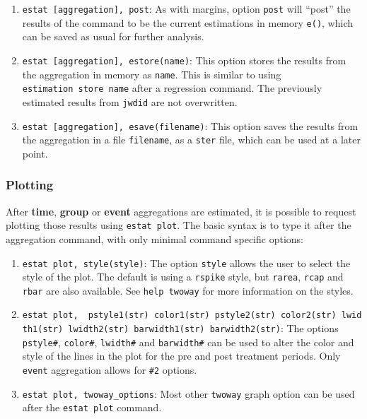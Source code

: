 \documentclass[
  letterpaper,
  DIV=11,
  numbers=noendperiod]{scrartcl}
\providecommand{\tightlist}{%
  \setlength{\itemsep}{0pt}\setlength{\parskip}{0pt}}\usepackage{longtable,booktabs,array}
\begin{document}
\begin{enumerate}
\def\labelenumi{\arabic{enumi}.}
\tightlist
\item
  \texttt{estat\ {[}aggregation{]},\ post}: As with margins, option
  \texttt{post} will ``post'' the results of the command to be the
  current estimations in memory \texttt{e()}, which can be saved as
  usual for further analysis.
\item
  \texttt{estat\ {[}aggregation{]},\ estore(name)}: This option stores
  the results from the aggregation in memory as \texttt{name}. This is
  similar to using \texttt{estimation\ store\ name} after a regression
  command. The previously estimated results from \texttt{jwdid} are not
  overwritten.
\item
  \texttt{estat\ {[}aggregation{]},\ esave(filename)}: This option saves
  the results from the aggregation in a file \texttt{filename}, as a
  \texttt{ster} file, which can be used at a later point.
\end{enumerate}

\subsubsection{Plotting}\label{plotting}

After \textbf{time}, \textbf{group} or \textbf{event} aggregations are
estimated, it is possible to request plotting those results using
\texttt{estat\ plot}. The basic syntax is to type it after the
aggregation command, with only minimal command specific options:

\begin{enumerate}
\def\labelenumi{\arabic{enumi}.}
\item
  \texttt{estat\ plot,\ style(style)}: The option \texttt{style} allows
  the user to select the style of the plot. The default is using a
  \texttt{rspike} style, but \texttt{rarea}, \texttt{rcap} and
  \texttt{rbar} are also available. See \texttt{help\ twoway} for more
  information on the styles.
\item
  \texttt{estat\ plot,\ \ pstyle1(str)\ color1(str)\ pstyle2(str)\ color2(str)\ lwidth1(str)\ lwidth2(str)\ barwidth1(str)\ barwidth2(str)}:
  The options \texttt{pstyle\#}, \texttt{color\#}, \texttt{lwidth\#} and
  \texttt{barwidth\#} can be used to alter the color and style of the
  lines in the plot for the pre and post treatment periods. Only
  \texttt{event} aggregation allows for \texttt{\#2} options.
\item
  \texttt{estat\ plot,\ twoway\_options}: Most other \texttt{twoway}
  graph option can be used after the \texttt{estat\ plot} command.
\end{enumerate}
\end{document}
